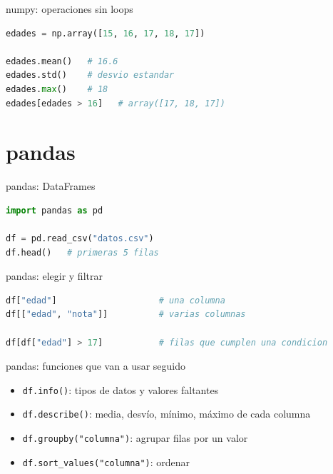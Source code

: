 \begin{frame}[fragile]{numpy: operaciones sin loops}
  \begin{lstlisting}[language=Python]
edades = np.array([15, 16, 17, 18, 17])

edades.mean()   # 16.6
edades.std()    # desvio estandar
edades.max()    # 18
edades[edades > 16]   # array([17, 18, 17])
  \end{lstlisting}
  \pause
\end{frame}

\section{pandas}

\begin{frame}[fragile]{pandas: DataFrames}
  \begin{lstlisting}[language=Python]
import pandas as pd

df = pd.read_csv("datos.csv")
df.head()   # primeras 5 filas
  \end{lstlisting}
\end{frame}

\begin{frame}[fragile]{pandas: elegir y filtrar}
  \begin{lstlisting}[language=Python]
df["edad"]                    # una columna
df[["edad", "nota"]]          # varias columnas

df[df["edad"] > 17]           # filas que cumplen una condicion
  \end{lstlisting}
\end{frame}

\begin{frame}[fragile]{pandas: funciones que van a usar seguido}
  \begin{itemize}
    \item \texttt{df.info()}: tipos de datos y valores faltantes
    \item \texttt{df.describe()}: media, desvío, mínimo, máximo de cada columna
    \item \texttt{df.groupby("columna")}: agrupar filas por un valor
    \item \texttt{df.sort\_values("columna")}: ordenar
  \end{itemize}
\end{frame}

